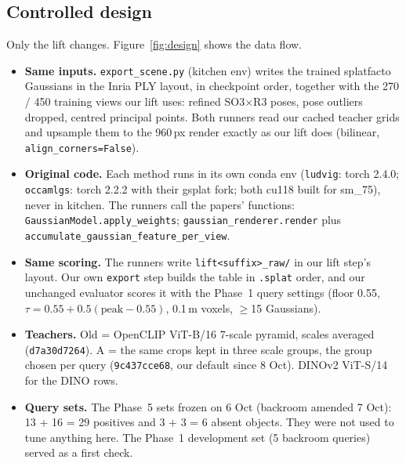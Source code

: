 \documentclass[11pt,a4paper]{article}
\newcommand{\code}[1]{\texttt{\small #1}}
\begin{document}
\subsection{Controlled design}
Only the lift changes. Figure~\ref{fig:design} shows the data flow.
\begin{itemize}[leftmargin=*,itemsep=1pt]
  \item \textbf{Same inputs.} \code{export\_scene.py} (kitchen env) writes the trained splatfacto Gaussians in the
        Inria PLY layout, in checkpoint order, together with the 270 / 450 training views our lift uses: refined
        SO3$\times$R3 poses, pose outliers dropped, centred principal points. Both runners read our cached teacher
        grids and upsample them to the 960\,px render exactly as our lift does (bilinear, \code{align\_corners=False}).
  \item \textbf{Original code.} Each method runs in its own conda env (\code{ludvig}: torch 2.4.0; \code{occamlgs}: torch
        2.2.2 with their gsplat fork; both cu118 built for sm\_75), never in kitchen. The runners call the papers'
        functions: \code{GaussianModel.apply\_weights}; \code{gaussian\_renderer.render} plus
        \code{accumulate\_gaussian\_feature\_per\_view}.
  \item \textbf{Same scoring.} The runners write \code{lift<suffix>\_raw/} in our lift step's layout. Our own
        \code{export} step builds the table in \code{.splat} order, and our unchanged evaluator scores it with the
        Phase~1 query settings (floor 0.55, $\tau=0.55+0.5(\text{peak}-0.55)$, 0.1\,m voxels, $\geq$15 Gaussians).
  \item \textbf{Teachers.} Old = OpenCLIP ViT-B/16 7-scale pyramid, scales averaged (\code{d7a30d7264}). A =
        the same crops kept in three scale groups, the group chosen per query (\code{9c437cce68}, our default since
        8 Oct). DINOv2 ViT-S/14 for the DINO rows.
  \item \textbf{Query sets.} The Phase~5 sets frozen on 6 Oct (backroom amended 7 Oct): 13 + 16 = 29 positives and
        3 + 3 = 6 absent objects. They were not used to tune anything here. The Phase~1 development set (5 backroom
        queries) served as a first check.
\end{itemize}
\end{document}

